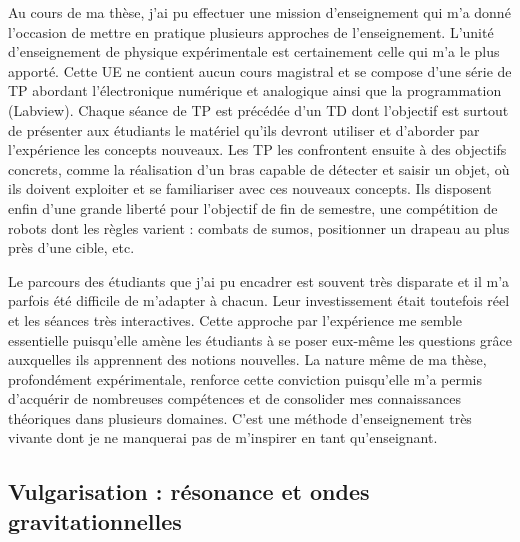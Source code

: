 \documentclass[12pt,a4paper]{article}
\begin{document}
Au cours de ma thèse, j'ai pu effectuer une mission d'enseignement qui m'a donné l'occasion de mettre en pratique plusieurs approches de l'enseignement.
L'unité d'enseignement de physique expérimentale est certainement celle qui m'a le plus apporté.
Cette UE ne contient aucun cours magistral et se compose d'une série de TP abordant l'électronique numérique et analogique ainsi que la programmation (Labview).
Chaque séance de TP est précédée d'un TD dont l'objectif est surtout de présenter aux étudiants le matériel qu'ils devront utiliser et d'aborder par l'expérience les concepts nouveaux.
Les TP les confrontent ensuite à des objectifs concrets, comme la réalisation d'un bras capable de détecter et saisir un objet, où ils doivent exploiter et se familiariser avec ces nouveaux concepts.
Ils disposent enfin d'une grande liberté pour l'objectif de fin de semestre, une compétition de robots dont les règles varient : combats de \og sumos\fg{}, positionner un drapeau au plus près d'une cible, etc.

Le parcours des étudiants que j'ai pu encadrer est souvent très disparate et il m'a parfois été difficile de m'adapter à chacun.
Leur investissement était toutefois réel et les séances très interactives.
Cette approche par l'expérience me semble essentielle puisqu'elle amène les étudiants à se poser eux-même les questions grâce auxquelles ils apprennent des notions nouvelles.
La nature même de ma thèse, profondément expérimentale, renforce cette conviction puisqu'elle m'a permis d'acquérir de nombreuses compétences et de consolider mes connaissances théoriques dans plusieurs domaines.
C'est une méthode d'enseignement très vivante dont je ne manquerai pas de m'inspirer en tant qu'enseignant.

\subsection{Vulgarisation : résonance et ondes gravitationnelles}
\end{document}
